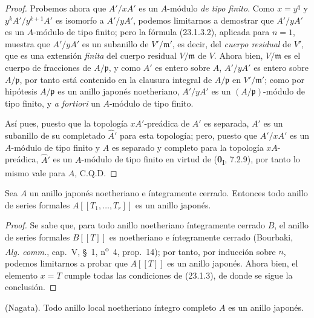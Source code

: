 \begin{proof}
Probemos ahora que $A'/xA'$ es un $A$-módulo \emph{de tipo finito}. Como $x=y^q$
y $y^kA'/y^{k+1}A'$ es isomorfo a $A'/yA'$, podemos limitarnos a
demostrar que $A'/yA'$ es un $A$-módulo de tipo finito; pero la fórmula
(23.1.3.2), aplicada para $n=1$, muestra que $A'/yA'$ es un subanillo de
$V'/\mathfrak m'$, es decir, del \emph{cuerpo residual} de $V'$, que es una
extensión \emph{finita} del cuerpo residual $V/\mathfrak m$ de $V$. Ahora bien,
$V/\mathfrak m$ es el cuerpo de fracciones de $A/\mathfrak p$, y como
$A'$ es entero sobre $A$, $A'/yA'$ es entero sobre $A/\mathfrak p$, por tanto
está contenido en la clausura integral de $A/\mathfrak p$ en
$V'/\mathfrak m'$; como por hipótesis $A/\mathfrak p$ es un anillo
japonés noetheriano, $A'/yA'$ es un $(A/\mathfrak p)$-módulo de tipo finito,
y \emph{a fortiori} un $A$-módulo de tipo finito.

Así pues, puesto que la topología $xA'$-preádica de $A'$ es separada, $A'$ es un
subanillo de su completado $\widehat A'$ para esta topología; pero, puesto que
$A'/xA'$ es un $A$-módulo de tipo finito y $A$ es separado y completo para
la topología $xA$-preádica, $\widehat A'$ es un $A$-módulo de tipo finito en
virtud de (\textbf{0}\textsubscript{I}, 7.2.9), por tanto lo mismo vale para $A$, C.Q.D.
\end{proof}

\begin{corollary}[23.1.4]
\label{0.23.1.4-es}
Sea $A$ un anillo japonés noetheriano e íntegramente cerrado. Entonces todo
anillo de series formales $A[[T_1,\ldots,T_r]]$ es un anillo japonés.
\end{corollary}

\begin{proof}
Se sabe que, para todo anillo noetheriano íntegramente cerrado $B$, el anillo de
series formales $B[[T]]$ es noetheriano e íntegramente cerrado (Bourbaki,
\emph{Alg. comm.}, cap.~V, §~1, n\textsuperscript{o}~4, prop.~14); por
tanto, por inducción sobre $n$, podemos limitarnos a probar que $A[[T]]$ es un anillo
japonés. Ahora bien, el elemento $x=T$ cumple todas las condiciones de (23.1.3), de donde
se sigue la conclusión.
\end{proof}

\begin{theorem}[23.1.5]
\label{0.23.1.5-es}
\textnormal{(Nagata).} Todo anillo local noetheriano íntegro \textup{completo} $A$ es
un anillo japonés.
\end{theorem}

